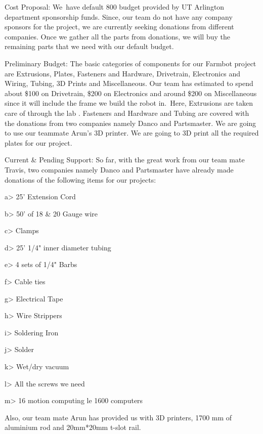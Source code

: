 Cost Proposal: We have default 800 budget provided by UT Arlington department sponsorship funds.  Since, our team do not have any company sponsors for the project, we are currently seeking donations from different companies. Once we gather all the parts from donations, we will buy the remaining parts that we need with our default budget.

Preliminary Budget: The basic categories of components for our Farmbot project are Extrusions, Plates, Fasteners and Hardware, Drivetrain, Electronics and Wiring, Tubing, 3D Prints and Miscellaneous. Our team has estimated to spend about \$100 on Drivetrain, \$200 on Electronics and around \$200 on Miscellaneous since it will include the frame we build the robot in. Here, Extrusions are taken care of through the lab . Fasteners and Hardware and Tubing are covered with the donations from two companies namely Danco and Partsmaster. We are going to use our teammate Arun's 3D printer. We are going to 3D print all the required plates for our project.

Current \& Pending Support: So far, with the great work from our team mate Travis, two companies namely Danco and Partsmaster have already made donations of the following items for our projects:


a> 25' Extension Cord

b> 50' of 18 \& 20 Gauge wire

c> Clamps

d> 25' 1/4" inner diameter tubing

e> 4 sets of 1/4" Barbs

f> Cable ties

g> Electrical Tape

h> Wire Strippers

i> Soldering Iron

j> Solder

k> Wet/dry vacuum

l> All the screws we need

m> 16 motion computing le 1600 computers


Also, our team mate Arun has provided us with 3D printers, 1700 mm of aluminium rod and 20mm*20mm t-slot rail.
